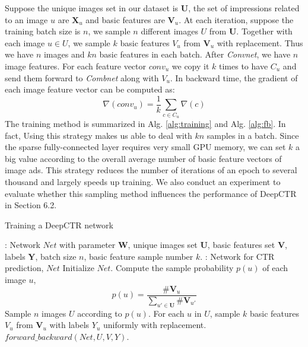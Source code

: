 \documentclass{sig-alternate}
\begin{document}
Suppose the unique  images set in our dataset is $\mathbf{U}$, the set of impressions related to an image $u$ are $\mathbf{X}_{u}$ and basic features are $\mathbf{V}_{u}$. At each iteration, suppose the training batch size is $n$, we sample $n$ different images $U$ from $\mathbf{U}$. Together with each image $u \in U$, we sample $k$ basic features $V_{u}$ from $\mathbf{V}_{u}$ with replacement. Thus we have $n$ images and $kn$ basic features in each batch.   After \emph{Convnet}, we have $n$ image features. For each feature vector $conv_{u}$ we copy it $k$ times to have $C_{u}$ and send them forward to \emph{Combnet} along with $V_{u}$. In backward time, the gradient of each image feature vector can be computed as:
\begin{equation}\label{eq:gradient}
\nabla(conv_{u}) = \frac{1}{k} \sum_{c \in C_{u}} \nabla(c)  
\end{equation}
The training method is summarized in Alg. \ref{alg:training} and Alg. \ref{alg:fb}. In fact, Using this strategy makes us able to deal with $kn$ samples in a batch. Since the sparse fully-connected layer requires very small GPU memory, we can set $k$ a big value according to the overall average number of basic feature vectors of image ads. This strategy reduces the number of iterations of an epoch to several thousand and largely  speeds up training. We also conduct an experiment to evaluate whether this sampling method influences  the performance of DeepCTR in Section  6.2.
\begin{algorithm}[tb]
	\caption{Training a DeepCTR network}
	\label{alg:training}
	\begin{algorithmic}[1]
		\renewcommand{\algorithmicrequire}{\textbf{Input:}}
		\renewcommand{\algorithmicensure}{\textbf{Output:}}
		\Require: Network $Net$ with parameter $\mathbf{W}$, unique images set $\mathbf{U}$, basic features set $\mathbf{V}$, labels $\mathbf{Y}$, batch size $n$, basic feature sample number $k$.  
		\Ensure: Network for CTR prediction, $Net$
		\State Initialize $Net$.
		\State Compute the sample probability $p(u)$ of each image $u$,
		\begin{equation}
		p(u) = \frac{\# \mathbf{V}_{u}}{\sum_{u' \in \mathbf{U}} \# \mathbf{V}_{u'}}
		\end{equation}
		\Repeat
		\State Sample $n$ images $U$ according to $p(u)$. 
		\State For each $u$ in $U$, sample $k$ basic features $V_{u}$ from $\mathbf{V}_{u}$ with labels $Y_{u}$ uniformly with replacement. 
		\State $forward\_backward(Net, U, V, Y)$.
	\end{algorithmic}
\end{algorithm}  
\end{document}
